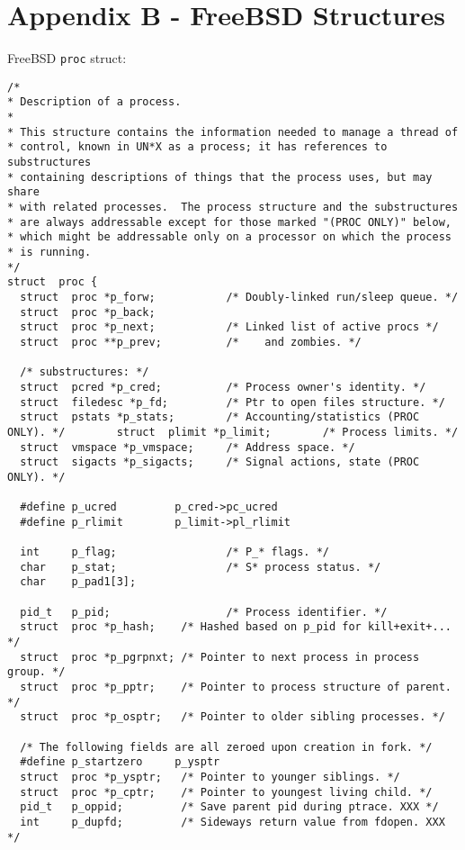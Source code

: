 \documentclass[10pt,letterpaper,onecolumn,draftclsnofoot]{IEEEtran}
\begin{document}
\section{Appendix B - FreeBSD Structures}
FreeBSD \texttt{proc} struct: \cite{freebsdstruct2016}
\begin{lstlisting}[caption=The FreeBSD proc structure is responsible for tracking the
state of processes.]
/*
* Description of a process.
*
* This structure contains the information needed to manage a thread of
* control, known in UN*X as a process; it has references to substructures
* containing descriptions of things that the process uses, but may share
* with related processes.  The process structure and the substructures
* are always addressable except for those marked "(PROC ONLY)" below,
* which might be addressable only on a processor on which the process
* is running.
*/
struct  proc {
  struct  proc *p_forw;           /* Doubly-linked run/sleep queue. */
  struct  proc *p_back;
  struct  proc *p_next;           /* Linked list of active procs */
  struct  proc **p_prev;          /*    and zombies. */

  /* substructures: */
  struct  pcred *p_cred;          /* Process owner's identity. */
  struct  filedesc *p_fd;         /* Ptr to open files structure. */
  struct  pstats *p_stats;        /* Accounting/statistics (PROC ONLY). */        struct  plimit *p_limit;        /* Process limits. */
  struct  vmspace *p_vmspace;     /* Address space. */
  struct  sigacts *p_sigacts;     /* Signal actions, state (PROC ONLY). */

  #define p_ucred         p_cred->pc_ucred
  #define p_rlimit        p_limit->pl_rlimit

  int     p_flag;                 /* P_* flags. */
  char    p_stat;                 /* S* process status. */
  char    p_pad1[3];

  pid_t   p_pid;                  /* Process identifier. */
  struct  proc *p_hash;    /* Hashed based on p_pid for kill+exit+... */
  struct  proc *p_pgrpnxt; /* Pointer to next process in process group. */
  struct  proc *p_pptr;    /* Pointer to process structure of parent. */
  struct  proc *p_osptr;   /* Pointer to older sibling processes. */

  /* The following fields are all zeroed upon creation in fork. */
  #define p_startzero     p_ysptr
  struct  proc *p_ysptr;   /* Pointer to younger siblings. */
  struct  proc *p_cptr;    /* Pointer to youngest living child. */
  pid_t   p_oppid;         /* Save parent pid during ptrace. XXX */
  int     p_dupfd;         /* Sideways return value from fdopen. XXX */


\end{lstlisting}
\end{document}

